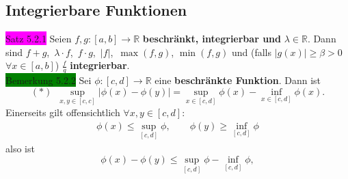 \documentclass[landscape, 10pt]{article}
\newcommand{\R}{\mathbb{R}}
\begin{document}
\begin{multicols}{3}
       \subsection{Integrierbare Funktionen}
              \colorbox{magenta}{Satz 5.2.1} 
                     Seien \textcolor{NavyBlue}{$f,g:[a,b]
                     \longrightarrow\R$} 
                     \textbf{beschränkt, integrierbar und} 
                     \textcolor{NavyBlue}{$\lambda\in\R$}. 
                     Dann sind \textcolor{NavyBlue}{$f+g$},\,
                     \textcolor{NavyBlue}{$\lambda\cdot f$},\,
                     \textcolor{NavyBlue}{$f\cdot g$},\,
                     \textcolor{NavyBlue}{$|f|$},\,
                     \textcolor{NavyBlue}{$\max(f,g)$},
                     \textcolor{NavyBlue}{$\min(f,g)$} und (falls 
                     \textcolor{NavyBlue}{
                     $|g(x)|\geqslant\beta>0$\\
                     $\forall x\in[a,b]$})
                     \textcolor{NavyBlue}{$\frac{f}{g}$}
                     \textbf{integrierbar}.\\
              \colorbox{green}{Bemerkung 5.2.2} 
                     Sei \textcolor{NavyBlue}{
                     $\phi:[c,d]\longrightarrow\R$} 
                     eine \textbf{beschränkte Funktion}. 
                     Dann ist 
                     \begin{equation*}
                            (*)\enspace
                            \sup\limits_{x,y\in[c,c]}|
                            \phi(x)-\phi(y)|
                            =\sup\limits_{x\in[c,d]}\phi(x)
                            -\inf\limits_{x\in[c,d]}\phi(x).
                     \end{equation*}
                     Einerseits gilt offensichtlich 
                     \textcolor{NavyBlue}{
                     $\forall x,y\in[c,d]$}: 
                     \begin{align*}
                            \phi(x)\leqslant
                            \sup\limits_{[c,d]}\phi,\qquad
                            \phi(y)\geqslant
                            \inf\limits_{[c,d]}\phi
                     \end{align*}
                     also ist 
                     \begin{equation*}
                            \phi(x)-\phi(y)\leqslant
                            \sup\limits_{[c,d]}\phi
                            -\inf\limits_{[c,d]}\phi,
                     \end{equation*}

\end{multicols}
\end{document}
